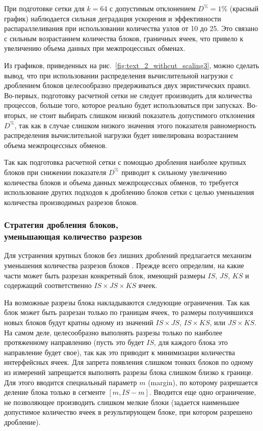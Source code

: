 При подготовке сетки для $k = 64$ с допустимым отклонением $D^{\%} = 1\%$ (красный график) наблюдается сильная деградация ускорения и эффективности распараллеливания при использовании количества узлов от 10 до 25.
Это связано с сильным возрастанием количества блоков, граничных ячеек, что привело к увеличению объема данных при межпроцессных обменах.

Из графиков, приведенных на рис.~\ref{fig:text_2_withcut_scaling3}, можно сделать вывод, что при использовании распределения вычислительной нагрузки с дроблением блоков целесообразно предерживаться двух эвристических правил.
Во-первых, подготовку расчетной сетки не следует производить для количества процессов, больше того, которое реально будет использоваться при запусках.
Во-вторых, не стоит выбирать слишком низкий показатель допустимого отклонения $D^{\%}$, так как в случае слишком низкого значения этого показателя равномерность распределения вычислительной нагрузки будет нивелирована возрастанием объема межпроцессных обменов.

Так как подготовка расчетной сетки с помощью дробления наиболее крупных блоков при снижении показателя $D^{\%}$ приводит к сильному увеличению количества блоков и объема данных межпроцессных обменов, то требуется использование других подходов к дроблению блоков сетки с целью уменьшения количества производимых разрезов блоков.

\subsubsection{Стратегия дробления блоков, \\ уменьшающая количество разрезов}

Для устранения крупных блоков без лишних дроблений предлагается механизм уменьшения количества разрезов блоков \cite{Bendersky2017Eff,Bendersky2018Block}.
Прежде всего определим, на какие части может быть разрезан конкретный блок, имеющий размеры $IS$, $JS$, $KS$ и содержащий соответственно $IS \times JS \times KS$ ячеек.

На возможные разрезы блока накладываются следующие ограничения.
Так как блок может быть разрезан только по границам ячеек, то размеры получившихся новых блоков будут кратны одному из значений $IS \times JS$, $IS \times KS$, или $JS \times KS$.
На самом деле, целесообразно выполнять разрезы только по наиболее протяженному направлению (пусть это будет $IS$, для каждого блока это направление будет свое), так как это приводит к минимизации количества интерфейсных ячеек.
Для запрета появления слишком тонких блоков по одному из измерений запрещается выполнять разрезы блока слишком близко к границе.
Для этого вводится специальный параметр $m$ (margin), по которому разрешается деление блока только в сегменте $[m, IS - m]$.
Вводится еще одно ограничение, не позволяющее производить слишком мелкие блоки (задается наименьшее допустимое количество ячеек в результирующем блоке, при котором разрешено дробление).

